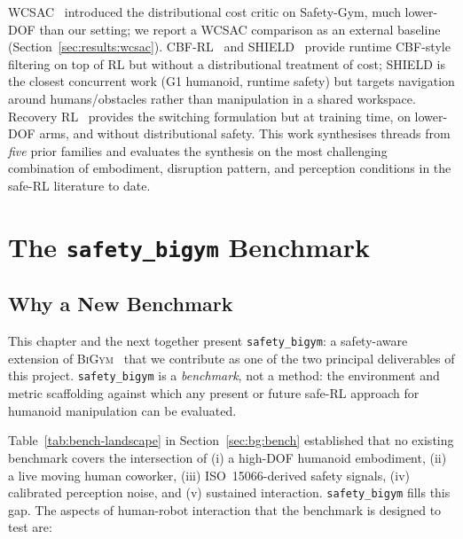 \documentclass[11pt,a4paper]{report}
\newcommand{\iso}{ISO~15066}
\newcommand{\bigym}{\textsc{BiGym}}
\newcommand{\sbigym}{\texttt{safety\_bigym}}
\begin{document}
WCSAC~\cite{yang2021wcsac} introduced the distributional cost
critic on Safety-Gym, much lower-DOF than our setting; we report a
WCSAC comparison as an external baseline
(Section~\ref{sec:results:wcsac}). CBF-RL~\cite{cbfrl2024} and
SHIELD~\cite{shield2025} provide runtime CBF-style filtering on top
of RL but without a distributional treatment of cost; SHIELD is the
closest concurrent work (G1 humanoid, runtime safety) but targets
navigation around humans/obstacles rather than manipulation in a
shared workspace. Recovery RL~\cite{thananjeyan2021recovery}
provides the switching formulation but at training time, on
lower-DOF arms, and without distributional safety. This work
synthesises threads from \emph{five} prior families and evaluates
the synthesis on the most challenging combination of embodiment,
disruption pattern, and perception conditions in the safe-RL
literature to date.

\chapter{The \texorpdfstring{\sbigym{}}{safety\_bigym} Benchmark}
\label{ch:benchmark-env}

\section{Why a New Benchmark}
\label{sec:bench:why}

This chapter and the next together present \sbigym{}: a safety-aware
extension of \bigym{}~\cite{chernyadev2024bigym} that we contribute
as one of the two principal deliverables of this project. \sbigym{}
is a \emph{benchmark}, not a method: the environment and
metric scaffolding against which any present or future safe-RL
approach for humanoid manipulation can be evaluated.

Table~\ref{tab:bench-landscape} in Section~\ref{sec:bg:bench}
established that no existing benchmark covers the intersection of
(i) a high-DOF humanoid embodiment, (ii) a live moving human
coworker, (iii) \iso{}-derived safety signals, (iv) calibrated
perception noise, and (v) sustained interaction. \sbigym{} fills
this gap. The aspects of human-robot interaction that the
benchmark is designed to test are:
\end{document}
